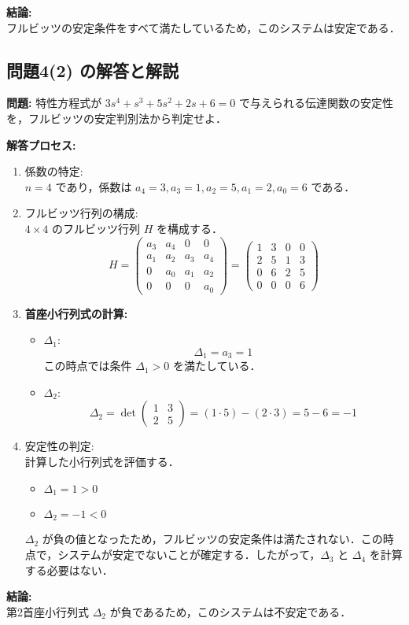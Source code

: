 \documentclass[11pt,a4paper]{ltjsarticle}
\begin{document}
\textbf{結論:}\\
フルビッツの安定条件をすべて満たしているため，このシステムは安定である．

\subsection{問題4(2) の解答と解説}

\textbf{問題:} 特性方程式が $3s^4+s^3+5s^2+2s+6=0$ で与えられる伝達関数の安定性を，フルビッツの安定判別法から判定せよ．

\textbf{解答プロセス:}

\begin{enumerate}
\item 係数の特定:\\
$n=4$ であり，係数は $a_4=3, a_3=1, a_2=5, a_1=2, a_0=6$ である．

\item フルビッツ行列の構成:\\
$4 \times 4$ のフルビッツ行列 $H$ を構成する．
$$H = \begin{pmatrix}
a_3 & a_4 & 0 & 0 \\
a_1 & a_2 & a_3 & a_4 \\
0 & a_0 & a_1 & a_2 \\
0 & 0 & 0 & a_0
\end{pmatrix} = \begin{pmatrix}
1 & 3 & 0 & 0 \\
2 & 5 & 1 & 3 \\
0 & 6 & 2 & 5 \\
0 & 0 & 0 & 6
\end{pmatrix}$$

\item \textbf{首座小行列式の計算:}
\begin{itemize}
\item $\Delta_1$:
$$\Delta_1 = a_3 = 1$$
この時点では条件 $\Delta_1 > 0$ を満たしている．
\item $\Delta_2$:
$$\Delta_2 = \det\begin{pmatrix} 1 & 3 \\ 2 & 5 \end{pmatrix} = (1 \cdot 5) - (2 \cdot 3) = 5 - 6 = -1$$
\end{itemize}

\item 安定性の判定:\\
計算した小行列式を評価する．
\begin{itemize}
\item $\Delta_1 = 1 > 0$
\item $\Delta_2 = -1 < 0$
\end{itemize}
$\Delta_2$ が負の値となったため，フルビッツの安定条件は満たされない．この時点で，システムが安定でないことが確定する．したがって，$\Delta_3$ と $\Delta_4$ を計算する必要はない．
\end{enumerate}

\textbf{結論:}\\
第2首座小行列式 $\Delta_2$ が負であるため，このシステムは不安定である．
\end{document}
